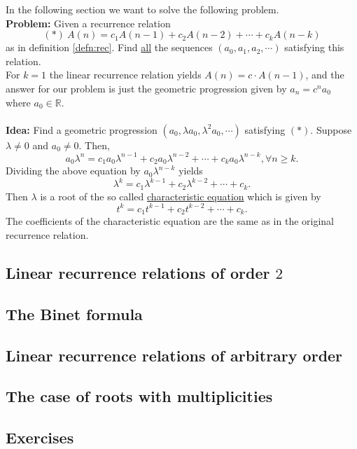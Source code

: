 In the following section we want to solve the following problem.\\
\textbf{Problem:} Given a recurrence relation
$$
(*)\ A(n)=c_1A(n-1)+c_2A(n-2)+\cdots+c_kA(n-k)
$$
as in definition \ref{defn:rec}. Find \underline{all} the sequences $(a_0, a_1, a_2, \cdots)$ satisfying this relation.
\\
For $k=1$ the linear recurrence relation yields $A(n)=c \cdot A(n-1)$, and the answer for our problem is just the geometric progression 
given by $a_n=c^n a_0$ where $a_0 \in \mathbb{R}$.
\\
\\
\noindent
\textbf{Idea:} Find a geometric progression $(a_0, \lambda a_0, \lambda^2 a_0, \cdots)$ satisfying $(*)$. Suppose $\lambda \neq 0$ and $a_0 \neq 0$.
Then,
$$
a_0 \lambda^n=c_1 a_0 \lambda^{n-1}+c_2 a_0 \lambda^{n-2} + \cdots + c_k a_0 \lambda^{n-k}, \forall n \geq k.
$$
Dividing the above equation by $a_0 \lambda^{n-k}$ yields 
$$
\lambda^k=c_1 \lambda^{k-1} + c_2 \lambda^{k-2} + \cdots + c_k.
$$
Then $\lambda$ is a root of the so called \underline{characteristic equation} which is given by
$$
t^k=c_1t^{k-1}+c_2 t^{k-2} + \cdots + c_k.
$$
The coefficients of the characteristic equation are the same as in the original recurrence relation.

\subsection{Linear recurrence relations of order $2$}

\subsection{The Binet formula}

\subsection{Linear recurrence relations of arbitrary order}

\subsection{The case of roots with multiplicities}

\subsection{Exercises}

